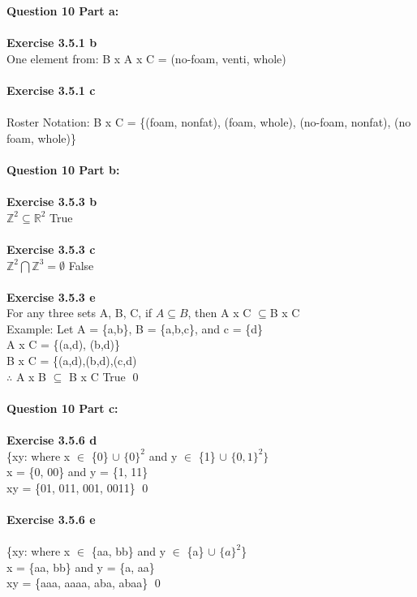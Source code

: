 \documentclass[11pt]{article}
\begin{document}
\newpage

\noindent \textbf{Question 10 Part a:}\\\\	
\textbf{Exercise 3.5.1 b }\\
One element from: B x A x C = (no-foam, venti, whole)\\\\
\textbf{Exercise 3.5.1 c }\\\\
Roster Notation: B x C = \{(foam, nonfat), (foam, whole), (no-foam, nonfat), (no foam, whole)\}\\\\
\noindent \textbf{Question 10 Part b:}\\\\	
\textbf{Exercise 3.5.3 b }\\
$\mathbb{Z}^2 \subseteq \mathbb{R}^2$ True\\\\
\textbf{Exercise 3.5.3 c }\\
$\mathbb{Z}^2 \bigcap \mathbb{Z}^3 = \emptyset $ False \\\\
\textbf{Exercise 3.5.3 e }\\
For any three sets A, B, C, if $A \subseteq B$, then A x C $\subseteq $B x C\\
Example: Let A = \{a,b\}, B = \{a,b,c\}, and c = \{d\}\\
A x C = \{(a,d), (b,d)\}\\
B x C = \{(a,d),(b,d),(c,d)\\
$\therefore$ A x B $\subseteq$ B x C True \qed\\\\


\noindent \textbf{Question 10 Part c:}\\\\	
\textbf{Exercise 3.5.6 d }\\
\{xy: where x $\in$ \{0\} $\cup$ $\{0\}^2$ and y $\in$ \{1\} $\cup$ $\{0, 1\}^2\}$\\
x = \{0, 00\} and y = \{1, 11\}\\
xy = \{01, 011, 001, 0011\} \qed\\\\
\textbf{Exercise 3.5.6 e }\\\\
\{xy: where x $\in$ \{aa, bb\} and y $\in$ \{a\} $\cup$ $\{a\}^2$\}\\
x = \{aa, bb\} and y = \{a, aa\}\\
xy = \{aaa, aaaa, aba, abaa\} \qed\\\\
\end{document}
